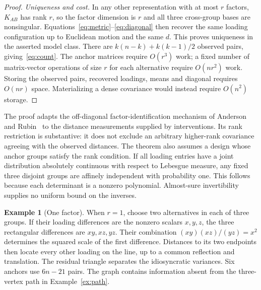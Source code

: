 \documentclass[11pt]{amsart}
\theoremstyle{definition}\newtheorem{example}[theorem]{Example}
\theoremstyle{remark}\newtheorem{remark}[theorem]{Remark}
\begin{document}
\begin{proof}
\emph{Uniqueness and cost.}
In any other representation with at most $r$ factors, $K_{AB}$ has rank $r$, so the factor dimension is $r$ and all three cross-group bases are nonsingular. Equations~\eqref{eq:metric}--\eqref{eq:diagonal} then recover the same loading configuration up to Euclidean motion and the same $d$. This proves uniqueness in the asserted model class. There are $k(n-k)+k(k-1)/2$ observed pairs, giving~\eqref{eq:count}. The anchor matrices require $O(r^3)$ work; a fixed number of matrix-vector operations of size $r$ for each alternative require $O(nr^2)$ work. Storing the observed pairs, recovered loadings, means and diagonal requires $O(nr)$ space. Materializing a dense covariance would instead require $O(n^2)$ storage.
\end{proof}

The proof adapts the off-diagonal factor-identification mechanism of Anderson and Rubin~\cite{anderson1956} to the distance measurements supplied by interventions. Its rank restriction is substantive: it does not exclude an arbitrary higher-rank covariance agreeing with the observed distances. The theorem also assumes a design whose anchor groups satisfy the rank condition. If all loading entries have a joint distribution absolutely continuous with respect to Lebesgue measure, any fixed three disjoint groups are affinely independent with probability one. This follows because each determinant is a nonzero polynomial. Almost-sure invertibility supplies no uniform bound on the inverses.

\begin{example}[One factor]
When $r=1$, choose two alternatives in each of three groups. If their loading differences are the nonzero scalars $x,y,z$, the three rectangular differences are $xy,xz,yz$. Their combination $(xy)(xz)/(yz)=x^2$ determines the squared scale of the first difference. Distances to its two endpoints then locate every other loading on the line, up to a common reflection and translation. The residual triangle separates the idiosyncratic variances. Six anchors use $6n-21$ pairs. The graph contains information absent from the three-vertex path in Example~\ref{ex:path}.
\end{example}
\end{document}
